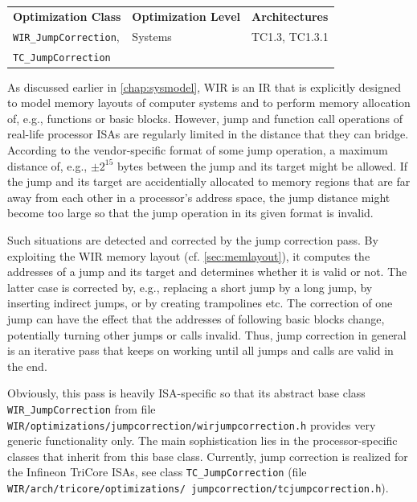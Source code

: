 \begin{tabular}{|l|l|l|}
  \hline
  \textbf{Optimization Class} & \textbf{Optimization Level} & \textbf{Architectures} \\
  \hhline{|=|=|=|}
  \texttt{WIR\_JumpCorrection}, & Systems & TC1.3, TC1.3.1 \\
  \texttt{TC\_JumpCorrection} & &  \\
  \hline
\end{tabular}

As discussed earlier in \cref{chap:sysmodel}, \gls{WIR} is an \gls{IR} that is explicitly designed to model memory layouts of computer systems and to perform memory allocation of, e.g., functions or basic blocks.
However, jump and function call operations of real-life processor \glspl{ISA} are regularly limited in the distance that they can bridge.
According to the vendor-specific format of some jump operation, a maximum distance of, e.g., $\pm2^{15}$ bytes between the jump and its target might be allowed.
If the jump and its target are accidentially allocated to memory regions that are far away from each other in a processor's address space, the jump distance might become too large so that the jump operation in its given format is invalid.

Such situations are detected and corrected by the jump correction pass.
By exploiting the \gls{WIR} memory layout (cf. \cref{sec:memlayout}), it computes the addresses of a jump and its target and determines whether it is valid or not.
The latter case is corrected by, e.g., replacing a short jump by a long jump, by inserting indirect jumps, or by creating trampolines etc.
The correction of one jump can have the effect that the addresses of following basic blocks change, potentially turning other jumps or calls invalid.
Thus, jump correction in general is an iterative pass that keeps on working until all jumps and calls are valid in the end.

Obviously, this pass is heavily \gls{ISA}-specific so that its abstract base class \texttt{WIR\_JumpCorrection} from file \texttt{WIR/op\-timizations/jumpcorrection/wirjumpcorrection.h} provides very generic functionality only.
The main sophistication lies in the processor-specific classes that inherit from this base class.
Currently, jump correction is realized for the Infineon TriCore \glspl{ISA}, see class \texttt{TC\_JumpCorrection} (file \texttt{WIR/arch/tricore/optimizations/ jumpcorrection/tcjumpcorrection.h}).

